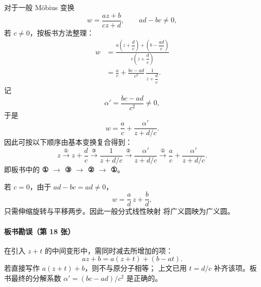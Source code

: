 对于一般 Möbius 变换
\[
  w=\frac{az+b}{cz+d},\qquad ad-bc\ne0,
\]
若 $c\ne0$，按板书方法整理：
\begin{align*}
  w
  &=\frac{a\left(z+\dfrac dc\right)+
             \left(b-\dfrac{ad}{c}\right)}
           {c\left(z+\dfrac dc\right)}\\
  &=\frac ac+\frac{bc-ad}{c^2}\,
        \frac1{z+\dfrac dc}.
\end{align*}
记
\[
  \alpha'=\frac{bc-ad}{c^2}\ne0,
\]
于是
\[
  \boxed{w=\frac ac+\frac{\alpha'}{z+d/c}}.
\]
因此可按以下顺序由基本变换复合得到：
\[
  z
  \xrightarrow{\text{①}}z+\frac dc
  \xrightarrow{\text{③}}\frac1{z+d/c}
  \xrightarrow{\text{②}}\frac{\alpha'}{z+d/c}
  \xrightarrow{\text{①}}\frac ac+\frac{\alpha'}{z+d/c}.
\]
即板书中的 \textbf{① $\to$ ③ $\to$ ② $\to$ ①}。

若 $c=0$，由于 $ad-bc=ad\ne0$，
\[
  w=\frac ad\,z+\frac bd,
\]
只需伸缩旋转与平移两步。因此一般分式线性映射
将广义圆映为广义圆。

\paragraph{板书勘误（第 18 张）}
在引入 $z+t$ 的中间变形中，需同时减去所增加的项：
\[
  az+b=a(z+t)+(b-at).
\]
若直接写作 $a(z+t)+b$，则不与原分子相等；
上文已用 $t=d/c$ 补齐该项。板书最终的分解系数
$\alpha'=(bc-ad)/c^2$ 是正确的。

